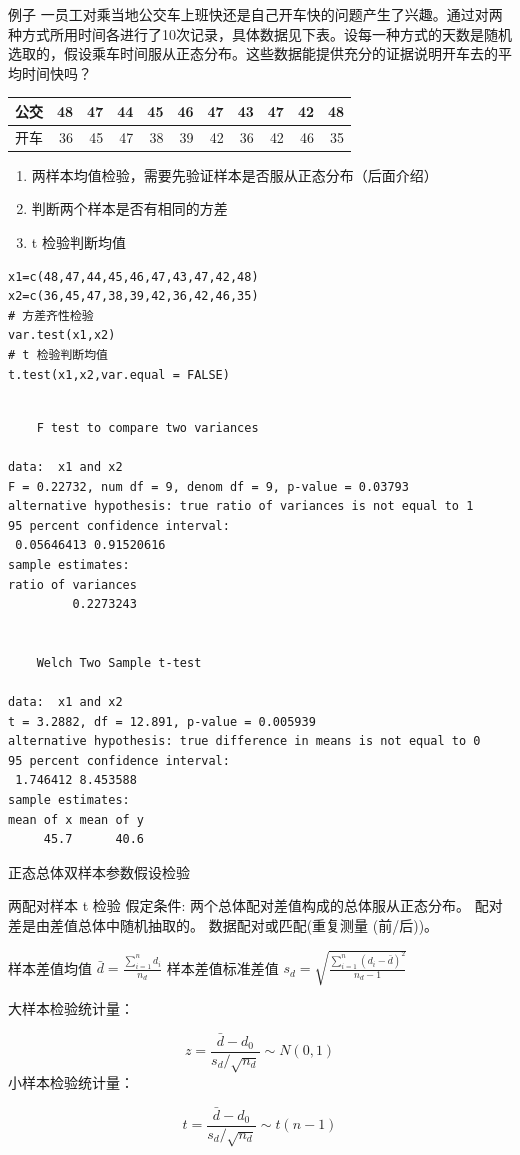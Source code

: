 \documentclass[presentation]{beamer}
\begin{document}
\begin{frame}[fragile,label={sec:org7623597}]{例子}
 一员工对乘当地公交车上班快还是自己开车快的问题产生了兴趣。通过对两种方式所用时间各进行了10次记录，具体数据见下表。设每一种方式的天数是随机选取的，假设乘车时间服从正态分布。这些数据能提供充分的证据说明开车去的平均时间快吗？

\begin{center}
\begin{tabular}{lrrrrrrrrrr}
公交 & 48 & 47 & 44 & 45 & 46 & 47 & 43 & 47 & 42 & 48\\
\hline
开车 & 36 & 45 & 47 & 38 & 39 & 42 & 36 & 42 & 46 & 35\\
\end{tabular}
\end{center}

\begin{enumerate}
\item 两样本均值检验，需要先验证样本是否服从正态分布（后面介绍）
\item 判断两个样本是否有相同的方差
\item t 检验判断均值
\end{enumerate}

\begin{verbatim}
x1=c(48,47,44,45,46,47,43,47,42,48)
x2=c(36,45,47,38,39,42,36,42,46,35)
# 方差齐性检验
var.test(x1,x2)
# t 检验判断均值
t.test(x1,x2,var.equal = FALSE)
\end{verbatim}

\begin{verbatim}

	F test to compare two variances

data:  x1 and x2
F = 0.22732, num df = 9, denom df = 9, p-value = 0.03793
alternative hypothesis: true ratio of variances is not equal to 1
95 percent confidence interval:
 0.05646413 0.91520616
sample estimates:
ratio of variances 
         0.2273243 


	Welch Two Sample t-test

data:  x1 and x2
t = 3.2882, df = 12.891, p-value = 0.005939
alternative hypothesis: true difference in means is not equal to 0
95 percent confidence interval:
 1.746412 8.453588
sample estimates:
mean of x mean of y 
     45.7      40.6 

\end{verbatim}
\end{frame}

\begin{frame}[label={sec:orge0288a6}]{正态总体双样本参数假设检验}
\begin{block}{两配对样本 t 检验}
假定条件:
两个总体配对差值构成的总体服从正态分布。
配对差是由差值总体中随机抽取的。
数据配对或匹配(重复测量 (前/后))。

样本差值均值 \(\bar d=\frac{\sum_{i=1}^n d_i}{n_d}\)   
样本差值标准差值 \(s_d=\sqrt{\frac{\sum_{i=1}^n(d_i-\bar d)^2}{n_d-1}}\)

大样本检验统计量：

$$ z=\frac{\bar d-d_0}{s_d/\sqrt{n_d}}\sim N(0,1)$$
小样本检验统计量：

$$ t=\frac{\bar d-d_0}{s_d/\sqrt{n_d}}\sim t(n-1)$$
\end{block}
\end{frame}
\end{document}
